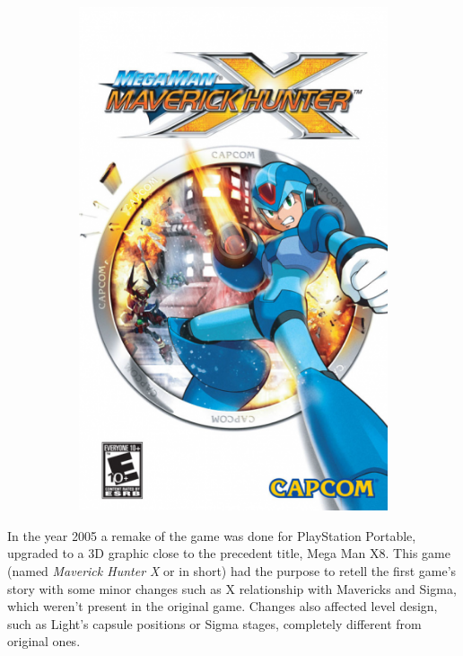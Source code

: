 \begin{figure}[htp]
\begin{subfigure}{0.4\linewidth}
		\includegraphics[width=\linewidth]{figures/X1/mmxmh.png}
	\end{subfigure}
\end{figure}

In the year 2005 a remake of the game was done for PlayStation Portable, upgraded to a 3D graphic close to the precedent title, Mega Man X8. This game (named \textit{Maverick Hunter X }or \mhx in short) had the purpose to retell the first game's story with some minor changes such as X relationship with Mavericks and Sigma, which weren't present in the original game. Changes also affected level design, such as Light's capsule positions or Sigma stages, completely different from original ones.

